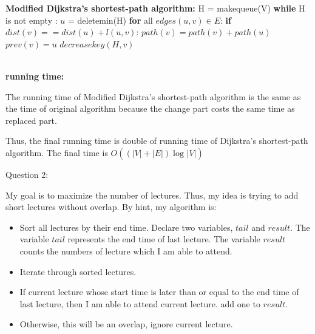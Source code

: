 \documentclass[12pt]{article}
\begin{document}
\begin{algorithm}
\begin{algorithmic}
\State \textbf{Modified Dijkstra’s shortest-path algorithm:}
\State \hspace{0.2cm} H = makequeue(V)
\State \hspace{0.2cm} \textbf{while} H is not empty :
\State \hspace{0.8cm} \textbf{} $u$ = deletemin(H)
\State \hspace{0.8cm} \textbf{for} all $edges (u, v) \in E$:
\State \hspace{1.6cm} \textbf{if} $dist(v) == dist(u) + l(u, v)$: 
\State \hspace{2.4cm} \textbf{} $path(v) = path(v) + path(u)$
\State \hspace{2.4cm} \textbf{} $prev(v) = u$
\State \hspace{2.4cm} \textbf{} $decreasekey(H, v)$
\end{algorithmic}
\end{algorithm}
\noindent \\
\textbf{running time:} \par
The running time of Modified Dijkstra’s shortest-path algorithm is the same as the time of original algorithm because the change part costs the same time as replaced part. \par
Thus, the final running time is double of running time of Dijkstra’s shortest-path algorithm. 
The final time is $O((|V| + |E|)\log_{}{|V|})$



\pagebreak
\noindent
\large Question 2: \vspace{5mm} \par
\normalsize 
My goal is to maximize the number of lectures. Thus, my idea is trying to add short lectures without overlap. By hint, my algorithm is:
\begin{itemize}
  \item	Sort all lectures by their end time. Declare two variables, $tail$ and $result$.
	The variable $tail$ represents the end time of last lecture. The variable $result$ counts the numbers of lecture which I am able to attend.
  \item Iterate through sorted lectures. 
  \item If current lecture whose start time is later than or equal to the end time of last lecture, then I am able to attend current lecture. 
	add one to $result$.
  \item Otherwise, this will be an overlap, ignore current lecture.
\end{itemize}
\end{document}
